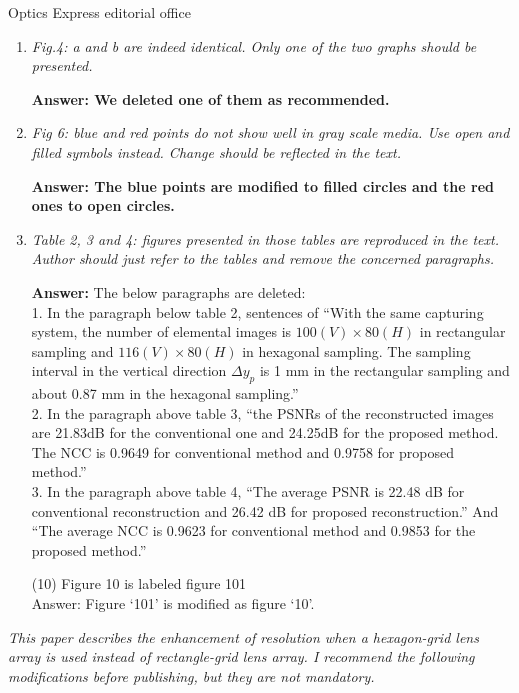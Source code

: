 \documentclass[a4paper,11pt]{letter}
\begin{document}
\begin{letter}{Optics Express editorial office}
\begin{enumerate}
\item \textit{Fig.4: a and b are indeed identical. Only one of the two graphs should be presented.}

\bigskip
\textbf{Answer: We deleted one of them as recommended.} 

\item \textit{Fig 6: blue and red points do not show well in gray scale media. Use open and filled symbols instead. Change should be reflected in the text.}

\bigskip
\textbf{Answer: The blue points are modified to filled circles and the red ones to open circles.} 
\item \textit{Table 2, 3 and 4: figures presented in those tables are reproduced in the text. Author should just refer to the tables and remove the concerned paragraphs.}

\bigskip
\textbf{Answer:} 
The below paragraphs are deleted:\\
1. In the paragraph below table 2, sentences of “With the same capturing system, the number of elemental images is $100(V)\times 80(H)$ in rectangular sampling and $116(V)\times 80(H)$ in hexagonal sampling. The sampling interval in the vertical direction $\Delta y_p$ is 1 mm in the rectangular sampling and about 0.87 mm in the hexagonal sampling.” \\

2. In the paragraph above table 3, “the PSNRs of the reconstructed images are 21.83dB for the conventional one and 24.25dB for the proposed method. The NCC is 0.9649 for conventional method and 0.9758 for proposed method.” \\

3. In the paragraph above table 4, “The average PSNR is 22.48 dB for conventional reconstruction and 26.42 dB for proposed reconstruction.” And “The average NCC is 0.9623 for conventional method and 0.9853 for the proposed method.” 

(10) Figure 10 is labeled figure 101 \\
Answer: Figure ‘101’ is modified as figure ‘10’.

\end{enumerate}


{}
\textit{This paper describes the enhancement of resolution when a hexagon-grid lens array is used instead of rectangle-grid lens array. I recommend the following modifications before publishing, but they are not mandatory.}


\end{letter}
\end{document}
